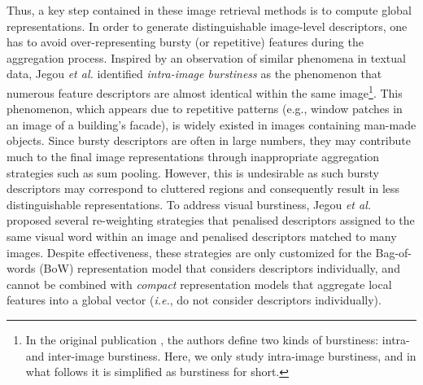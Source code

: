 \documentclass[journal]{IEEEtran}
\begin{document}
Thus, a key step contained in these image retrieval methods is to compute global representations.
In order to generate distinguishable image-level descriptors, one has to avoid over-representing bursty (or repetitive) features during the aggregation process.
Inspired by an observation of similar phenomena in textual data, Jegou \textit{et al.} \cite{jegou2009burstiness} identified \emph{intra-image burstiness} as the phenomenon that numerous feature descriptors are almost identical within the same image\footnote{In the original publication \cite{jegou2009burstiness}, the authors define two kinds of burstiness: intra- and inter-image burstiness. Here,  we only study intra-image burstiness, and in what follows it is simplified as burstiness for short.}.
This phenomenon, which appears due to repetitive patterns (e.g., window patches in an image of a building's facade), is widely existed in images containing man-made objects.
Since bursty descriptors are often in large numbers, they may contribute much to the final image representations through inappropriate aggregation strategies such as sum pooling.
However, this is undesirable as such bursty descriptors may correspond to cluttered regions and consequently result in less distinguishable representations.
To address visual burstiness, Jegou \textit{et al.} \cite{jegou2009burstiness} proposed several re-weighting strategies that penalised
descriptors assigned to the same visual word within an image and penalised descriptors matched to many images.
Despite effectiveness, these strategies are only customized for the Bag-of-words (BoW) representation model that considers descriptors individually, and cannot be
combined with \emph{compact} representation models that aggregate local features into a global vector (\emph{i.e.}, do not consider descriptors individually).
\end{document}
